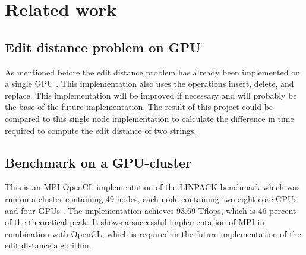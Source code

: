 \section{Related work}

\subsection{Edit distance problem on GPU}
As mentioned before the edit distance problem has already been implemented on a single GPU \cite{Heus}.
This implementation also uses the operations insert, delete, and replace.
This implementation will be improved if necessary and will probably be the base of the future implementation.
The result of this project could be compared to this single node implementation to calculate the difference in time required to compute the edit distance of two strings.

\subsection{Benchmark on a GPU-cluster}
This is an MPI-OpenCL implementation of the LINPACK benchmark which was run on a cluster containing 49 nodes, each node containing two eight-core CPUs and four GPUs \cite{Cluster}.
The implementation achieves 93.69 Tflops, which is 46 percent of the theoretical peak.
It shows a successful implementation of MPI in combination with OpenCL, which is required in the future implementation of the edit distance algorithm.
